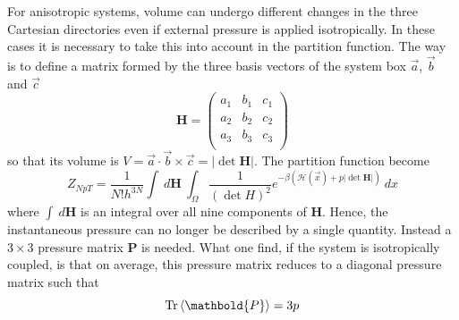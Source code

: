 For anisotropic systems, volume can undergo different changes in the three Cartesian directories even if external 
pressure is applied isotropically. In these cases it is necessary to take this into account in the partition 
function. The way is to define a matrix formed by the three basis vectors of the system box $\vec a$, $\vec b$ 
and $\vec c$
\begin{equation}
	 \mathbold{H} = 
	\begin{pmatrix}
		a_1 & b_1 & c_1 \\
		a_2 & b_2 & c_2 \\
		a_3 & b_3 & c_3 \\
	\end{pmatrix}
	\label{eq:volumeMatrix}
\end{equation}
so that its volume is $V = \vec a\cdot \vec b\times \vec c = |\det{ \mathbold{H}}|$. The partition function become
\begin{equation*}
	Z_{NpT} = \frac{1}{N!h^{3N}}\int\ d \mathbold{H} \ \int_\Omega \frac{1}{(\det{H})^2} e^{-\beta(\mathcal{H}(\vec x) + p|\det{ \mathbold{H}}|)}\ dx
\end{equation*}
where $\int\ d\mathbold{H}$ is an integral over all nine components of $\mathbold{H}$. Hence, the instantaneous 
pressure can no longer be described by a single quantity. Instead a $3\times 3$ pressure matrix $ \mathbold{P}$ 
is needed. What one find, if the system is isotropically coupled, is that on average, this pressure matrix 
reduces to a diagonal pressure matrix such that
\begin{equation*}
	\text{Tr}\ave{ \mathbold{P}} = 3p
\end{equation*}



